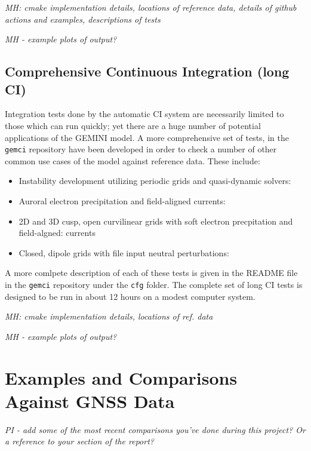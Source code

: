 \documentclass[11pt,letterpaper]{article}
\begin{document}
\emph{MH:  cmake implementation details, locations of reference data, details of github actions and examples, descriptions of tests}

\emph{MH - example plots of output?}

\subsection{Comprehensive Continuous Integration (long CI)}

Integration tests done by the automatic CI system are necessarily limited to those which can run quickly; yet there are a huge number of potential applications of the GEMINI model.  A more comprehensive set of tests, in the \texttt{gemci} repository have been developed in order to check a number of other common use cases of the model against reference data.  These include:
\begin{itemize}
  \item Instability development utilizing periodic grids and quasi-dynamic solvers:  
  \item Auroral electron precipitation and field-aligned currents:  
  \item 2D and 3D cusp, open curvilinear grids with soft electron precpitation and field-algned:   currents
  \item Closed, dipole grids with file input neutral perturbations:  
\end{itemize}
A more comlpete description of each of these tests is given in the README file in the \texttt{gemci} repository under the \texttt{cfg} folder.  The complete set of long CI tests is designed to be run in about 12 hours on a modest computer system.  

\emph{MH:  cmake implementation details, locations of ref. data}

\emph{MH - example plots of output?}



\section{Examples and Comparisons Against GNSS Data}

\emph{PI - add some of the most recent comparisons you've done during this project?  Or a reference to your section of the report?}



\pagebreak
\setcounter{page}{1}


\end{document}

